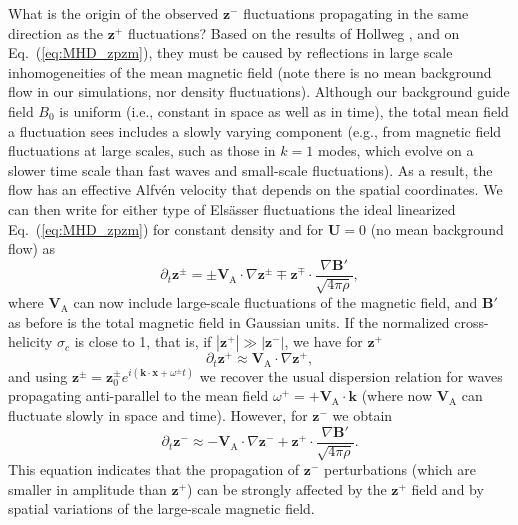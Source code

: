 \documentclass[aip,pop,reprint,amsmath,amssymb,floatfix]{revtex4-1}
\renewcommand{\vec}[1]{\mathbf{#1}}
\begin{document}
What is the origin of the observed $\vec{z}^-$ fluctuations
propagating in the same direction as the $\vec{z}^+$ fluctuations?
Based on the results of Hollweg \cite{hollweg_1990_wkb}, and on 
Eq.~(\ref{eq:MHD_zpzm}), they must be caused by reflections in
large scale inhomogeneities of the mean magnetic field (note there is
no mean background flow in our simulations, nor density fluctuations). 
Although our background guide field $B_0$ is uniform (i.e., constant 
in space as well as in time), the total mean field a fluctuation sees 
includes a slowly varying component (e.g., from magnetic field 
fluctuations at large scales, such as those in $k=1$ modes, which 
evolve on a slower time scale than fast waves and small-scale fluctuations). 
As a result, the flow has an effective Alfv\'en velocity that depends on 
the spatial coordinates. We can then write for either type of Els\"asser
fluctuations the ideal linearized Eq.~(\ref{eq:MHD_zpzm}) for constant
density and for $\vec{U}=0$ (no mean background flow) as
\begin{equation}
\partial_t \vec{z}^\pm = \pm \vec{V}_\textrm{A} \cdot \nabla \vec{z}^\pm 
    \mp \vec{z}^\mp \cdot \frac{\nabla \vec{B}'}{\sqrt{4\pi \rho}} ,
\end{equation}
where $\vec{V}_\textrm{A}$ can now include large-scale fluctuations of
the magnetic field, and $\vec{B}'$ as before is the total magnetic
field in Gaussian units. If the normalized cross-helicity $\sigma_c$ is close to 1,
that is, if $|\vec{z}^+| \gg |\vec{z}^-|$, we have for $\vec{z}^+$
\begin{equation}
\partial_t \vec{z}^+  \approx \vec{V}_\textrm{A} \cdot \nabla \vec{z}^+ ,
\end{equation}
and using
$\vec{z}^\pm = \vec{z}_0^\pm e^{i(\vec{k}\cdot \vec{x}+\omega^\pm t)}$
we recover the usual dispersion relation for waves propagating
anti-parallel to the mean field
$\omega^+ = +\vec{V}_\textrm{A} \cdot \vec{k}$ (where now
$\vec{V}_\textrm{A}$ can fluctuate slowly in space and time). However,
for $\vec{z}^-$ we obtain
\begin{equation}
\partial_t \vec{z}^- \approx - \vec{V}_\textrm{A} \cdot \nabla \vec{z}^- + \vec{z}^+ 
    \cdot \frac{\nabla \vec{B}'}{\sqrt{4\pi \rho}} .
\label{eq:zmlinear}
\end{equation}
This equation indicates that the propagation of $\vec{z}^-$
perturbations (which are smaller in amplitude than $\vec{z}^+$) can be
strongly affected by the $\vec{z}^+$ field and by spatial variations
of the large-scale magnetic field.
\end{document}
